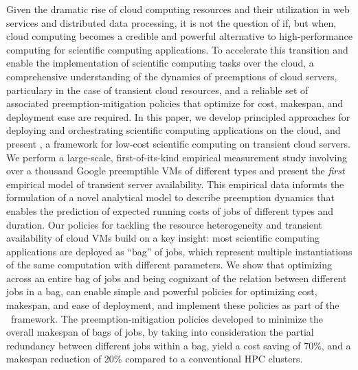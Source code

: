 
Given the dramatic rise of cloud computing resources and their utilization in web services and distributed data processing, it is not the question of if, but when, cloud computing becomes a credible and powerful alternative to high-performance computing for scientific computing applications. To accelerate this transition and enable the implementation of scientific computing tasks over the cloud, a comprehensive understanding of the dynamics of preemptions of cloud servers, particulary in the case of transient cloud resources, and a reliable set of associated preemption-mitigation policies that optimize for cost, makespan, and deployment ease are required. 
In this paper, we develop principled approaches for deploying and orchestrating scientific computing applications on the cloud, and present \sysname, a framework for low-cost scientific computing on  transient cloud servers. 
We perform a large-scale, first-of-its-kind empirical measurement study involving over a thousand Google preemptible VMs of different types and present the \emph{first} empirical model of transient server availability. This empirical data informts the formulation of a novel analytical model to describe preemption dynamics that enables the prediction of expected running costs of jobs of different types and duration.
Our policies for tackling the resource heterogeneity and transient availability of cloud VMs build on a key insight: most scientific computing applications are deployed as ``bag'' of jobs, which represent multiple instantiations of the same computation with different parameters.
We show that optimizing across an entire bag of jobs and being cognizant of the relation between different jobs in a bag, can enable simple and powerful policies for optimizing cost, makespan, and ease of deployment, and implement these policies as part of the \sysname~framework. 
The preemption-mitigation policies developed to minimize the overall makespan of bags of jobs, by taking into consideration the partial redundancy between different jobs within a bag, yield a cost saving of 70\%, and a makespan reduction of 20\% compared to a conventional HPC clusters.



